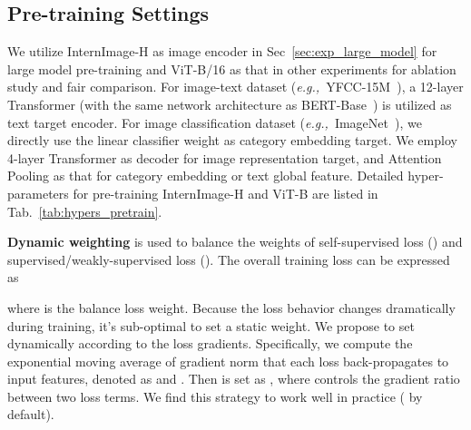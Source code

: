 \documentclass[10pt,twocolumn,letterpaper]{article}
\def\eg{\textit{e.g.,~}}
\begin{document}
\subsection{Pre-training Settings}
\label{sec:appendix_pre}
We utilize InternImage-H as image encoder in Sec~\ref{sec:exp_large_model} for large model pre-training and ViT-B/16 as that in other experiments for ablation study and fair comparison. For image-text dataset (\eg YFCC-15M~\cite{thomee2016yfcc100m}), a 12-layer Transformer (with the same network architecture as BERT-Base~\cite{devlin2018bert}) is utilized as text target encoder. For image classification dataset (\eg ImageNet~\cite{deng2009imagenet}), we directly use the linear classifier weight as category embedding target. We employ 4-layer Transformer as decoder for image representation target, and Attention Pooling as that for category embedding or text global feature. Detailed hyper-parameters for pre-training InternImage-H and ViT-B are listed in Tab.~\ref{tab:hypers_pretrain}.

\vspace{0.5em}\noindent\textbf{Dynamic weighting} is used to balance the weights of self-supervised loss () and supervised/weakly-supervised loss (). The overall training loss can be expressed as

where  is the balance loss weight. Because the loss behavior changes dramatically during training, it's sub-optimal to set a static weight. We propose to set  dynamically according to the loss gradients. Specifically, we compute the exponential moving average of gradient norm that each loss back-propagates to input features, denoted as  and . Then  is set as , where  controls the gradient ratio between two loss terms. We find this strategy to work well in practice ( by default).
\end{document}
